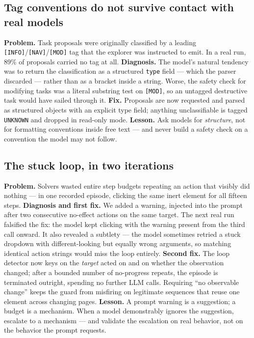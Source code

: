 \subsection{Tag conventions do not survive contact with real models}

\textbf{Problem.} Task proposals were originally classified by a leading
\texttt{[INFO]}/\texttt{[NAV]}/\texttt{[MOD]} tag that the explorer was
instructed to emit. In a real run, 89\% of proposals carried no tag at all.
\textbf{Diagnosis.} The model's natural tendency was to return the
classification as a structured \texttt{type} field --- which the parser
discarded --- rather than as a bracket inside a string. Worse, the safety
check for modifying tasks was a literal substring test on \texttt{[MOD]}, so
an untagged destructive task would have sailed through it.
\textbf{Fix.} Proposals are now requested and parsed as structured objects
with an explicit type field; anything unclassifiable is tagged
\texttt{UNKNOWN} and dropped in read-only mode.
\textbf{Lesson.} Ask models for \emph{structure}, not for formatting
conventions inside free text --- and never build a safety check on a
convention the model may not follow.

\subsection{The stuck loop, in two iterations}

\textbf{Problem.} Solvers wasted entire step budgets repeating an action that
visibly did nothing --- in one recorded episode, clicking the same inert
element for all fifteen steps.
\textbf{Diagnosis and first fix.} We added a warning, injected into the
prompt after two consecutive no-effect actions on the same target. The next
real run falsified the fix: the model kept clicking with the warning present
from the third call onward. It also revealed a subtlety --- the model
sometimes retried a stuck dropdown with different-looking but equally wrong
arguments, so matching identical action strings would miss the loop entirely.
\textbf{Second fix.} The loop detector now keys on the \emph{target} acted
on and on whether the observation changed; after a bounded number of
no-progress repeats, the episode is terminated outright, spending no further
LLM calls. Requiring ``no observable change'' keeps the guard from misfiring
on legitimate sequences that reuse one element across changing pages.
\textbf{Lesson.} A prompt warning is a suggestion; a budget is a mechanism.
When a model demonstrably ignores the suggestion, escalate to a mechanism ---
and validate the escalation on real behavior, not on the behavior the prompt
requests.

